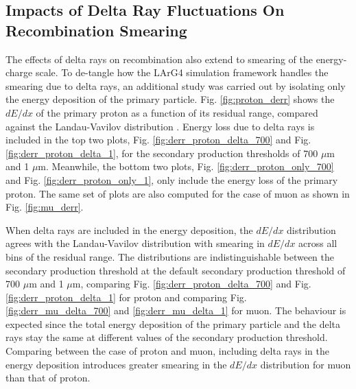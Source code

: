 \subsection{Impacts of Delta Ray Fluctuations On Recombination Smearing}
\label{sec:impactDeltaRaySmear}

The effects of delta rays on recombination also extend to smearing of the energy-charge scale.
To de-tangle how the LArG4 simulation framework handles the smearing due to delta rays, an additional study was carried out by isolating only the energy deposition of the primary particle.
Fig. \ref{fig:proton_derr} shows the $dE/dx$ of the primary proton as a function of its residual range, compared against the Landau-Vavilov distribution \cite{Passage}.
Energy loss due to delta rays is included in the top two plots, Fig. \ref{fig:derr_proton_delta_700} and Fig. \ref{fig:derr_proton_delta_1}, for the secondary production thresholds of 700 $\mu$m and 1 $\mu$m.
Meanwhile, the bottom two plots, Fig. \ref{fig:derr_proton_only_700} and Fig. \ref{fig:derr_proton_only_1}, only include the energy loss of the primary proton.
The same set of plots are also computed for the case of muon as shown in Fig. \ref{fig:mu_derr}.

When delta rays are included in the energy deposition, the $dE/dx$ distribution agrees with the Landau-Vavilov distribution with smearing in $dE/dx$ across all bins of the residual range.
The distributions are indistinguishable between the secondary production threshold at the default secondary production threshold of 700 $\mu$m and 1 $\mu$m, comparing Fig. \ref{fig:derr_proton_delta_700} and Fig. \ref{fig:derr_proton_delta_1} for proton and comparing Fig. \ref{fig:derr_mu_delta_700} and \ref{fig:derr_mu_delta_1} for muon. 
The behaviour is expected since the total energy deposition of the primary particle and the delta rays stay the same at different values of the secondary production threshold.
Comparing between the case of proton and muon, including delta rays in the energy deposition introduces greater smearing in the $dE/dx$ distribution for muon than that of proton.

